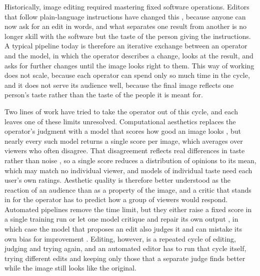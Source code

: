 \documentclass[runningheads]{llncs}
\begin{document}
Historically, image editing required mastering fixed software operations. Editors that follow plain-language instructions have changed this \cite{brooks2023instructpix2pix, flux2024}, because anyone can now ask for an edit in words, and what separates one result from another is no longer skill with the software but the taste of the person giving the instructions. A typical pipeline today is therefore an iterative exchange between an operator and the model, in which the operator describes a change, looks at the result, and asks for further changes until the image looks right to them. This way of working does not scale, because each operator can spend only so much time in the cycle, and it does not serve its audience well, because the final image reflects one person's taste rather than the taste of the people it is meant for.

Two lines of work have tried to take the operator out of this cycle, and each leaves one of these limits unresolved. Computational aesthetics replaces the operator's judgment with a model that scores how good an image looks \cite{murray2012ava, talebi2018nima, ke2023vila, wu2024qalign}, but nearly every such model returns a single score per image, which averages over viewers who often disagree. That disagreement reflects real differences in taste rather than noise \cite{uma2021, plank2022, yang2022para}, so a single score reduces a distribution of opinions to its mean, which may match no individual viewer, and models of individual taste \cite{ren2017personalized, zhu2022meta, pamela2026} need each user's own ratings. Aesthetic quality is therefore better understood as the reaction of an audience than as a property of the image, and a critic that stands in for the operator has to predict how a group of viewers would respond. Automated pipelines remove the time limit, but they either raise a fixed score in a single training run \cite{xu2023imagereward, black2024ddpo, wallace2024dpo} or let one model critique and repair its own output \cite{madaan2023selfrefine, wu2024sld, wang2024genartist}, in which case the model that proposes an edit also judges it and can mistake its own bias for improvement \cite{xu2024selfbias}. Editing, however, is a repeated cycle of editing, judging and trying again, and an automated editor has to run that cycle itself, trying different edits and keeping only those that a separate judge finds better while the image still looks like the original.
\end{document}
